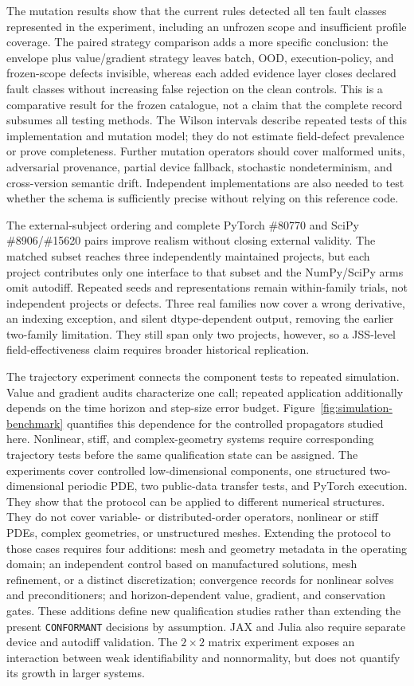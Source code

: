 \documentclass[preprint,12pt]{elsarticle}
\begin{document}
The mutation results show that the current rules detected all ten fault classes represented in the experiment, including an unfrozen scope and insufficient profile coverage. The paired strategy comparison adds a more specific conclusion: the envelope plus value/gradient strategy leaves batch, OOD, execution-policy, and frozen-scope defects invisible, whereas each added evidence layer closes declared fault classes without increasing false rejection on the clean controls. This is a comparative result for the frozen catalogue, not a claim that the complete record subsumes all testing methods. The Wilson intervals describe repeated tests of this implementation and mutation model; they do not estimate field-defect prevalence or prove completeness. Further mutation operators should cover malformed units, adversarial provenance, partial device fallback, stochastic nondeterminism, and cross-version semantic drift. Independent implementations are also needed to test whether the schema is sufficiently precise without relying on this reference code.

The external-subject ordering and complete PyTorch \#80770 and SciPy \#8906/\#15620 pairs improve realism without closing external validity. The matched subset reaches three independently maintained projects, but each project contributes only one interface to that subset and the NumPy/SciPy arms omit autodiff. Repeated seeds and representations remain within-family trials, not independent projects or defects. Three real families now cover a wrong derivative, an indexing exception, and silent dtype-dependent output, removing the earlier two-family limitation. They still span only two projects, however, so a JSS-level field-effectiveness claim requires broader historical replication.

The trajectory experiment connects the component tests to repeated simulation.
Value and gradient audits characterize one call; repeated application additionally
depends on the time horizon and step-size error budget. Figure~\ref{fig:simulation-benchmark}
quantifies this dependence for the controlled propagators studied here. Nonlinear,
stiff, and complex-geometry systems require corresponding trajectory tests before
the same qualification state can be assigned.
The experiments cover controlled low-dimensional components, one structured two-dimensional periodic PDE, two public-data transfer tests, and PyTorch execution. They show that the protocol can be applied to different numerical structures. They do not cover variable- or distributed-order operators, nonlinear or stiff PDEs, complex geometries, or unstructured meshes. Extending the protocol to those cases requires four additions: mesh and geometry metadata in the operating domain; an independent control based on manufactured solutions, mesh refinement, or a distinct discretization; convergence records for nonlinear solves and preconditioners; and horizon-dependent value, gradient, and conservation gates. These additions define new qualification studies rather than extending the present \texttt{CONFORMANT} decisions by assumption. JAX and Julia also require separate device and autodiff validation. The $2\times2$ matrix experiment exposes an interaction between weak identifiability and nonnormality, but does not quantify its growth in larger systems.
\end{document}
